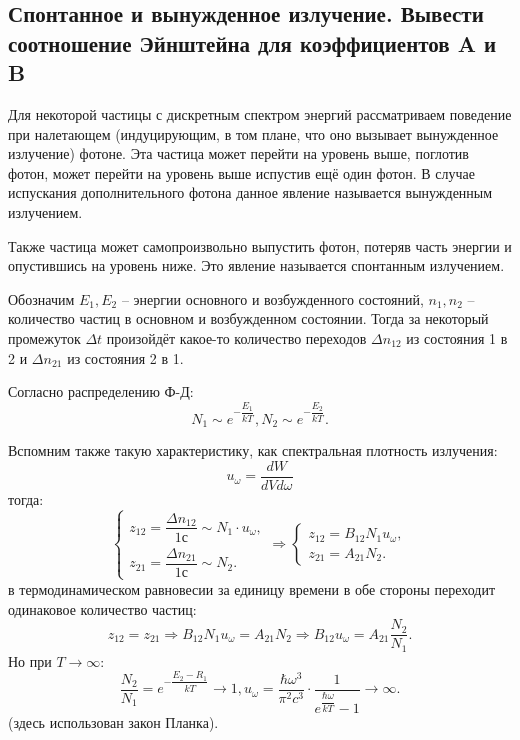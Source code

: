 \subsection{Спонтанное и вынужденное излучение. Вывести соотношение Эйнштейна для
коэффициентов A и B}\label{einstein-a-b}

Для некоторой частицы с дискретным спектром энергий рассматриваем поведение при налетающем
(индуцирующим, в том плане, что оно вызывает вынужденное излучение) фотоне. Эта частица может
перейти на уровень выше, поглотив фотон, может перейти на уровень выше испустив ещё один фотон.
В случае испускания дополнительного фотона данное явление называется вынужденным излучением.

Также частица может самопроизвольно выпустить фотон, потеряв часть энергии и опустившись на
уровень ниже. Это явление называется спонтанным излучением.

Обозначим $E_1, E_2$ -- энергии основного и возбужденного состояний, $n_1, n_2$ -- количество
частиц в основном и возбужденном состоянии. Тогда за некоторый промежуток $\Delta t$ произойдёт
какое-то количество переходов $\Delta n_{12}$ из состояния 1 в 2 и $\Delta n_{21}$ из
состояния 2 в 1.

Согласно распределению Ф-Д:
\[
  N_1 \sim e^{-\dfrac{E_1}{kT}}, N_2 \sim e^{-\dfrac{E_2}{kT}}.
\]

Вспомним также такую характеристику, как спектральная плотность излучения:
\[
  u_\omega = \dfrac{dW}{dV d\omega}
\]
тогда:
\[
  \begin{cases}
    z_{12} = \dfrac{\Delta n_{12}}{1 с} \sim N_1 \cdot u_\omega, \\
    z_{21} = \dfrac{\Delta n_{21}}{1 с} \sim N_2. 
  \end{cases}
  \Rightarrow
  \begin{cases}
    z_{12} = B_{12} N_1 u_\omega, \\
    z_{21} = A_{21} N_2.
  \end{cases}
\]
в термодинамическом равновесии за единицу времени в обе стороны переходит одинаковое количество 
частиц:
\[
  z_{12} = z_{21} \Rightarrow
  B_{12} N_1 u_\omega = A_{21} N_2
  \Rightarrow
  B_{12} u_\omega = A_{21} \dfrac{N_2}{N_1}.
\]
Но при $T \to \infty$:
\[
  \dfrac{N_2}{N_1} = e^{- \dfrac{E_2-R_1}{kT}} \to 1,
  u_\omega = \dfrac{\hbar \omega^3}{\pi^2 c^3} \cdot \dfrac{1}{e^{\dfrac{\hbar \omega}{kT}} - 1} \to \infty.
\]
(здесь использован закон Планка).

